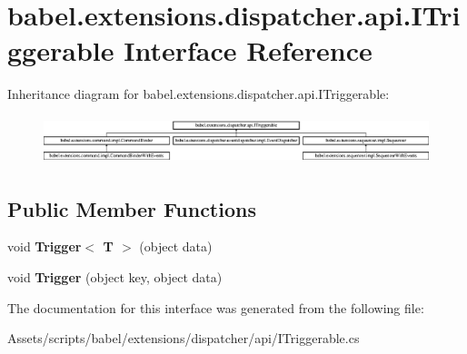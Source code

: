 \hypertarget{interfacebabel_1_1extensions_1_1dispatcher_1_1api_1_1_i_triggerable}{\section{babel.\-extensions.\-dispatcher.\-api.\-I\-Triggerable Interface Reference}
\label{interfacebabel_1_1extensions_1_1dispatcher_1_1api_1_1_i_triggerable}
}
Inheritance diagram for babel.\-extensions.\-dispatcher.\-api.\-I\-Triggerable\-:\begin{figure}[H]
\begin{center}
\leavevmode
\includegraphics[height=1.421320cm]{interfacebabel_1_1extensions_1_1dispatcher_1_1api_1_1_i_triggerable}
\end{center}
\end{figure}
\subsection*{Public Member Functions}
\begin{DoxyCompactItemize}
\item 
\hypertarget{interfacebabel_1_1extensions_1_1dispatcher_1_1api_1_1_i_triggerable_a9201985648c66ac2b3a88f68cd008f63}{void {\bfseries Trigger$<$ T $>$} (object data)}\label{interfacebabel_1_1extensions_1_1dispatcher_1_1api_1_1_i_triggerable_a9201985648c66ac2b3a88f68cd008f63}

\item 
\hypertarget{interfacebabel_1_1extensions_1_1dispatcher_1_1api_1_1_i_triggerable_a9757cd5b73f586be2795a5f317754f9d}{void {\bfseries Trigger} (object key, object data)}\label{interfacebabel_1_1extensions_1_1dispatcher_1_1api_1_1_i_triggerable_a9757cd5b73f586be2795a5f317754f9d}

\end{DoxyCompactItemize}


The documentation for this interface was generated from the following file\-:\begin{DoxyCompactItemize}
\item 
Assets/scripts/babel/extensions/dispatcher/api/I\-Triggerable.\-cs\end{DoxyCompactItemize}
